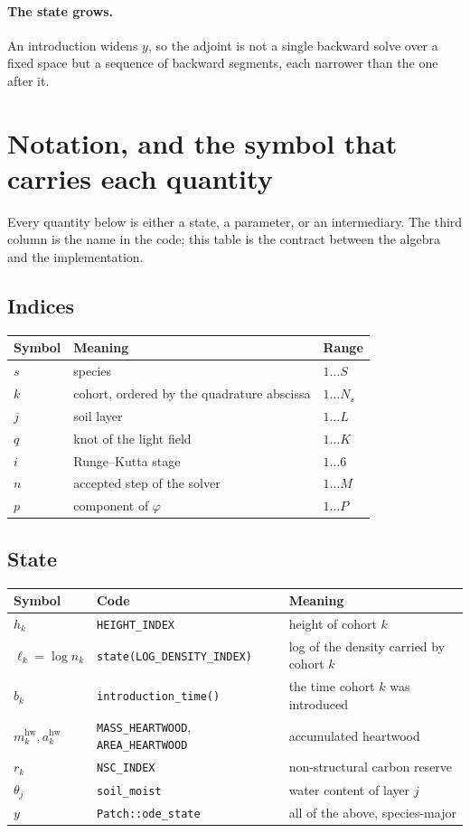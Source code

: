 \documentclass[11pt,a4paper]{article}
\newcommand{\code}[1]{\texttt{\small #1}}
\begin{document}
\paragraph{The state grows.} An introduction widens $y$, so the adjoint is not a
single backward solve over a fixed space but a sequence of backward segments,
each narrower than the one after it.

\section{Notation, and the symbol that carries each quantity}
\label{sec:notation}

Every quantity below is either a state, a parameter, or an intermediary. The
third column is the name in the code; this table is the contract between the
algebra and the implementation.

\subsection{Indices}

\begin{longtable}{@{}lll@{}}
\toprule
Symbol & Meaning & Range \\
\midrule
$s$ & species & $1 \dots S$ \\
$k$ & cohort, ordered by the quadrature abscissa & $1 \dots N_s$ \\
$j$ & soil layer & $1 \dots L$ \\
$q$ & knot of the light field & $1 \dots K$ \\
$i$ & Runge--Kutta stage & $1 \dots 6$ \\
$n$ & accepted step of the solver & $1 \dots M$ \\
$p$ & component of $\varphi$ & $1 \dots P$ \\
\bottomrule
\end{longtable}

\subsection{State}

\begin{longtable}{@{}llp{}@{}}
\toprule
Symbol & Code & Meaning \\
\midrule
$h_k$ & \code{HEIGHT\_INDEX} & height of cohort $k$ \\
$\ell_k = \log n_k$ & \code{state(LOG\_DENSITY\_INDEX)} & log of the density carried by cohort $k$ \\
$b_k$ & \code{introduction\_time()} & the time cohort $k$ was introduced \\
$m^{\mathrm{hw}}_k, a^{\mathrm{hw}}_k$ & \code{MASS\_HEARTWOOD}, \code{AREA\_HEARTWOOD} & accumulated heartwood \\
$r_k$ & \code{NSC\_INDEX} & non-structural carbon reserve \\
$\theta_j$ & \code{soil\_moist} & water content of layer $j$ \\
$y$ & \code{Patch::ode\_state} & all of the above, species-major \\
\bottomrule
\end{longtable}
\end{document}
